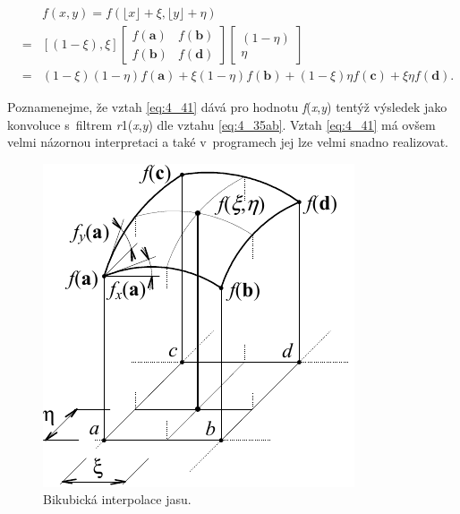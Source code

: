 \begin{eqnarray} \label{eq:4_41}
    && f(x, y) = f(\lfloor x \rfloor + \xi, \lfloor y \rfloor + \eta) \\
    &=& \left[ \left( 1 - \xi\right), \xi \right] \left[
    \begin{array}{cc}
    f(\mathbf{a}) & f(\mathbf{b}) \\
    f(\mathbf{b}) & f(\mathbf{d})
    \end{array}
    \right]
    \left[
    \begin{array}{c}
    (1 - \eta) \\
    \eta
    \end{array}
    \right] \nonumber \\
    &=& (1 - \xi)(1 - \eta)f(\mathbf{a}) + \xi(1 - \eta)f(\mathbf{b}) + (1 - \xi)\eta f(\mathbf{c}) + \xi \eta f(\mathbf{d}). \nonumber
\end{eqnarray}
 
Poznamenejme, že vztah \eqref{eq:4_41} dává pro hodnotu \textit{f}(\textit{x},\textit{y}) tentýž výsledek jako konvoluce s~filtrem \textit{r}1(\textit{x},\textit{y}) dle vztahu \eqref{eq:4_35ab}. Vztah \eqref{eq:4_41} má ovšem velmi názornou interpretaci a také v~programech jej lze velmi snadno realizovat.

\begin{figure}[th]
    \begin{center}
        \includegraphics[scale=1.0]{04_digitalizace/images/img_4_8.pdf}
    \end{center}
    \caption{Bikubická interpolace jasu.}
    \label{img:4_8}
\end{figure}

